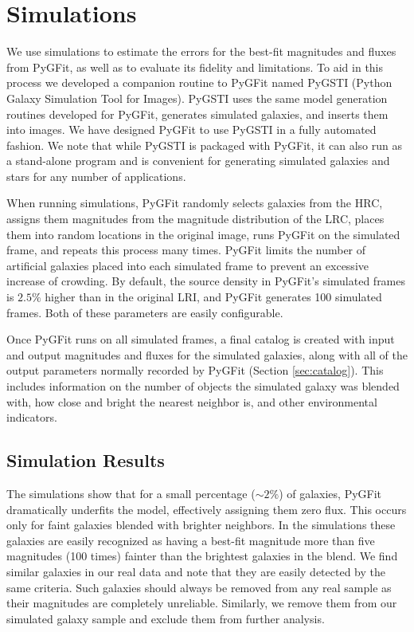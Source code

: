 \documentclass[preprint]{aastex}
\newcommand{\pygfit}{PyGFit}
\newcommand{\pygsti}{PyGSTI}
\begin{document}
\section{Simulations}\label{sec:sims}

We use simulations to estimate the errors for the best-fit magnitudes and fluxes from \pygfit{}, as well as to evaluate its fidelity and limitations.  To aid in this process we developed a companion routine to \pygfit{} named \pygsti{} (Python Galaxy Simulation Tool for Images).  \pygsti{} uses the same model generation routines developed for \pygfit{}, generates simulated galaxies, and inserts them into images.  We have designed \pygfit{} to use \pygsti{} in a fully automated fashion.  We note that while \pygsti{} is packaged with \pygfit{}, it can also run as a stand-alone program and is convenient for generating simulated galaxies and stars for any number of applications.

When running simulations, \pygfit{} randomly selects galaxies from the HRC, assigns them magnitudes from the magnitude distribution of the LRC, places them into random locations in the original image, runs \pygfit{} on the simulated frame, and repeats this process many times.  \pygfit{} limits the number of artificial galaxies placed into each simulated frame to prevent an excessive increase of crowding.  By default, the source density in \pygfit{}'s simulated frames is $2.5\%$ higher than in the original LRI, and \pygfit{} generates 100 simulated frames.  Both of these parameters are easily configurable.

Once \pygfit{} runs on all simulated frames, a final catalog is created with input and output magnitudes and fluxes for the simulated galaxies, along with all of the output parameters normally recorded by \pygfit{} (Section \ref{sec:catalog}).  This includes information on the number of objects the simulated galaxy was blended with, how close and bright the nearest neighbor is, and other environmental indicators.

\subsection{Simulation Results}


The simulations show that for a small percentage ($\sim2\%$) of galaxies, \pygfit{} dramatically underfits the model, effectively assigning them zero flux.  This occurs only for faint galaxies blended with brighter neighbors. In the simulations these galaxies are easily recognized as having a best-fit magnitude more than five magnitudes (100 times) fainter than the brightest galaxies in the blend. 
We find similar galaxies in our real data and note that they are easily detected by the same criteria.  Such galaxies should always be removed from any real sample as their magnitudes are completely unreliable.  Similarly, we remove them from our simulated galaxy sample and exclude them from further analysis.
\end{document}
